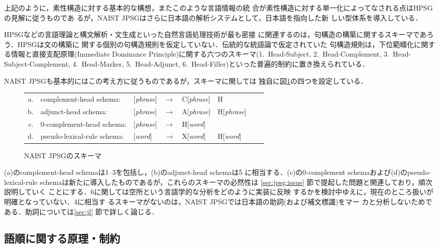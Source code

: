 上記のように，素性構造に対する基本的な構想，またこのような言語情報の統
合が素性構造に対する単一化によってなされる点はHPSGの見解に従うものであ
るが，NAIST JPSGはさらに日本語の解析システムとして，日本語を指向した新
しい型体系を導入している．

HPSGなどの言語理論と構文解析・文生成といった自然言語処理技術が最も密接
に関連するのは，句構造の構築に関するスキーマであろう．HPSGは文の構築に
関する個別の句構造規則を仮定していない．伝統的な統語論で仮定されていた
句構造規則は，下位範疇化に関する情報と直接支配原理(Immediate Dominance
Principle)に関する六つのスキーマ(1.~Head-Subject, 2.~Head-Complement,
3.~Head-Subject-Complement, 4.~Head-Marker, 5.~Head-Adjunct,
6.~Head-Filler)といった普遍的制約に置き換えられている．

NAIST JPSGも基本的にはこの考え方に従うものであるが，スキーマに関しては
独自に図\ref{fig:schm}の四つを設定している．
\begin{figure}
\begin{center}
\begin{tabular}{rllcllcl}
a. & complement-head schema:     & [{\it phrase}] & $\rightarrow$ &
	C[{\it phrase}] & H \\
b. & adjunct-head schema:        & [{\it phrase}] & $\rightarrow$ &
	A[{\it phrase}] & H[{\it phrase}]\\
c. & 0-complement-head schema:   & [{\it phrase}] & $\rightarrow$ &
	H[{\it word}] & \\
d. & pseudo-lexical-rule schema: & [{\it word}]   & $\rightarrow$ &
	X[{\it word}] & H[{\it word}] \\
\end{tabular} 
\end{center}
\caption{NAIST JPSGのスキーマ{\protect\footnotemark}}\label{fig:schm}
\end{figure}
(a)のcomplement-head schemaは1--3を包括し，(b)のadjunct-head schemaは5 
に相当する．(c)の0-complement schemaおよび(d)のpseudo-lexical-rule
schemaは新たに導入したものであるが，これらのスキーマの必然性は
\ref{sec:jpsg:issue} 節で提起した問題と関連しており，順次説明していく
ことにする．6に関しては空所という言語学的な分析をどのように実装に反映
するかを検討中ゆえに，現在のところ扱いが明確となっていない．4に相当す
るスキーマがないのは，NAIST JPSGでは日本語の助詞(および補文標識)をマー
カと分析しないためである．助詞については\ref{sec:jl} 節で詳しく論じる．


\subsection{語順に関する原理・制約}\label{sec:jpsg:worder}

